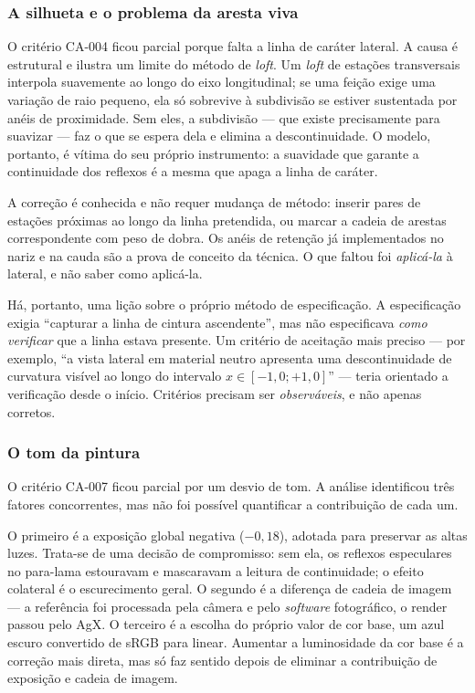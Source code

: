 \subsubsection{A silhueta e o problema da aresta viva}

O crit\'erio CA-004 ficou parcial porque falta a linha de car\'ater lateral. A causa \'e
estrutural e ilustra um limite do m\'etodo de \emph{loft}. Um \emph{loft} de
esta\c{c}\~oes transversais interpola suavemente ao longo do eixo longitudinal; se uma
fei\c{c}\~ao exige uma varia\c{c}\~ao de raio pequeno, ela s\'o sobrevive \`a
subdivis\~ao se estiver sustentada por an\'eis de proximidade. Sem eles, a
subdivis\~ao --- que existe precisamente para suavizar --- faz o que se espera dela e
elimina a descontinuidade. O modelo, portanto, \'e v\'itima do seu pr\'oprio instrumento: a
suavidade que garante a continuidade dos reflexos \'e a mesma que apaga a linha de
car\'ater.

A corre\c{c}\~ao \'e conhecida e n\~ao requer mudan\c{c}a de m\'etodo: inserir pares de
esta\c{c}\~oes pr\'oximas ao longo da linha pretendida, ou marcar a cadeia de arestas
correspondente com peso de dobra. Os an\'eis de reten\c{c}\~ao j\'a implementados no nariz e
na cauda s\~ao a prova de conceito da t\'ecnica. O que faltou foi \emph{aplic\'a-la} \`a
lateral, e n\~ao saber como aplic\'a-la.

H\'a, portanto, uma li\c{c}\~ao sobre o pr\'oprio m\'etodo de especifica\c{c}\~ao. A
especifica\c{c}\~ao exigia ``capturar a linha de cintura ascendente'', mas n\~ao
especificava \emph{como verificar} que a linha estava presente. Um crit\'erio de
aceita\c{c}\~ao mais preciso --- por exemplo, ``a vista lateral em material neutro apresenta
uma descontinuidade de curvatura vis\'ivel ao longo do intervalo
$x \in [-1{,}0; +1{,}0]$'' --- teria orientado a verifica\c{c}\~ao desde o in\'icio.
Crit\'erios precisam ser \emph{observ\'aveis}, e n\~ao apenas corretos.

\subsubsection{O tom da pintura}

O crit\'erio CA-007 ficou parcial por um desvio de tom. A an\'alise identificou tr\^es
fatores concorrentes, mas n\~ao foi poss\'ivel quantificar a contribui\c{c}\~ao de cada um.

O primeiro \'e a exposi\c{c}\~ao global negativa ($-0{,}18$), adotada para preservar as
altas luzes. Trata-se de uma decis\~ao de compromisso: sem ela, os reflexos especulares no
para-lama estouravam e mascaravam a leitura de continuidade; o efeito colateral \'e o
escurecimento geral. O segundo \'e a diferen\c{c}a de cadeia de imagem --- a
refer\^encia foi processada pela c\^amera e pelo \emph{software} fotogr\'afico, o render
passou pelo AgX. O terceiro \'e a escolha do pr\'oprio valor de cor base, um azul escuro
convertido de sRGB para linear. Aumentar a luminosidade da cor base \'e a corre\c{c}\~ao
mais direta, mas s\'o faz sentido depois de eliminar a contribui\c{c}\~ao de
exposi\c{c}\~ao e cadeia de imagem.

